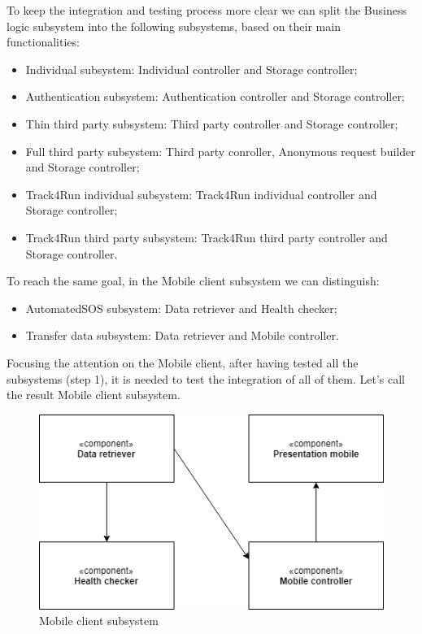 To keep the integration and testing process more clear we can split the Business logic subsystem into the following subsystems, based on their main functionalities:
	\begin{itemize}
	\item Individual subsystem: Individual controller and Storage controller;
	\item Authentication subsystem: Authentication controller and Storage controller;
	\item Thin third party subsystem: Third party controller and Storage controller;
	\item Full third party subsystem: Third party conroller, Anonymous request builder and Storage controller;
	\item Track4Run individual subsystem: Track4Run individual controller and Storage controller;
	\item Track4Run third party subsystem: Track4Run third party controller and Storage controller.\\
	\end{itemize}

To reach the same goal, in the Mobile client subsystem we can distinguish:
	\begin{itemize}
	\item AutomatedSOS subsystem: Data retriever and Health checker;
	\item Transfer data subsystem: Data retriever and Mobile controller.\\
	\end{itemize}

Focusing the attention on the Mobile client, after having tested all the subsystems (step 1), it is needed to test the integration of all of them. Let's call the result Mobile client subsystem.
	\begin{figure}[H]
	\centering
	\includegraphics[scale=0.5] {images/integration/mobileClient.png}
	\caption {Mobile client subsystem}
	\end{figure}
	
